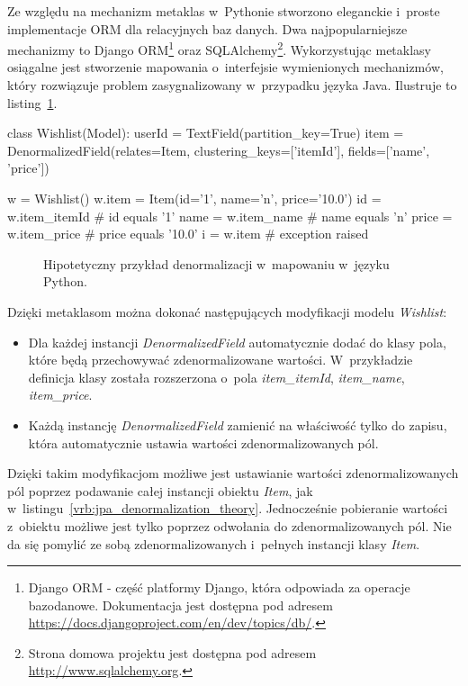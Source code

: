 Ze względu na mechanizm metaklas w~Pythonie stworzono eleganckie i~proste implementacje ORM dla relacyjnych baz danych. Dwa najpopularniejsze mechanizmy to Django ORM\footnote{Django ORM - część platformy Django, która odpowiada za operacje bazodanowe. Dokumentacja jest dostępna pod adresem \url{https://docs.djangoproject.com/en/dev/topics/db/}.} oraz SQLAlchemy\footnote{Strona domowa projektu jest dostępna pod adresem \url{http://www.sqlalchemy.org}.}. Wykorzystując metaklasy osiągalne jest stworzenie mapowania o~interfejsie wymienionych mechanizmów, który rozwiązuje problem zasygnalizowany w~przypadku języka Java. Ilustruje to listing~\ref{vrb:sql_alchemy_like_denormalization}.

\begin{verbbox}
	class Wishlist(Model):
	    userId = TextField(partition_key=True)
	    item = DenormalizedField(relates=Item, 
	                             clustering_keys=['itemId'], 
	                             fields=['name', 'price'])

	w = Wishlist()
	w.item = Item(id='1', name='n', price='10.0')
	id = w.item_itemId    # id equals '1'
	name = w.item_name    # name equals 'n'
	price = w.item_price  # price equals '10.0'
	i = w.item            # exception raised
\end{verbbox}

\begin{figure}[ht!]
	\centering
	\theverbbox
	\caption{Hipotetyczny przykład denormalizacji w~mapowaniu w~języku Python.}
	\label{vrb:sql_alchemy_like_denormalization}
\end{figure}

Dzięki metaklasom można dokonać następujących modyfikacji modelu \emph{Wishlist}:

\begin{itemize}
	\item Dla każdej instancji \emph{DenormalizedField} automatycznie dodać do klasy pola, które będą przechowywać zdenormalizowane wartości. W~przykładzie definicja klasy została rozszerzona o~pola \emph{item\_itemId}, \emph{item\_name}, \emph{item\_price}.
	\item Każdą instancję \emph{DenormalizedField} zamienić na właściwość tylko do zapisu, która automatycznie ustawia wartości zdenormalizowanych pól.
\end{itemize}

Dzięki takim modyfikacjom możliwe jest ustawianie wartości zdenormalizowanych pól poprzez podawanie całej instancji obiektu \emph{Item}, jak w~listingu~\ref{vrb:jpa_denormalization_theory}. Jednocześnie pobieranie wartości z~obiektu możliwe jest tylko poprzez odwołania do zdenormalizowanych pól. Nie da się pomylić ze sobą zdenormalizowanych i~pełnych instancji klasy \emph{Item}.